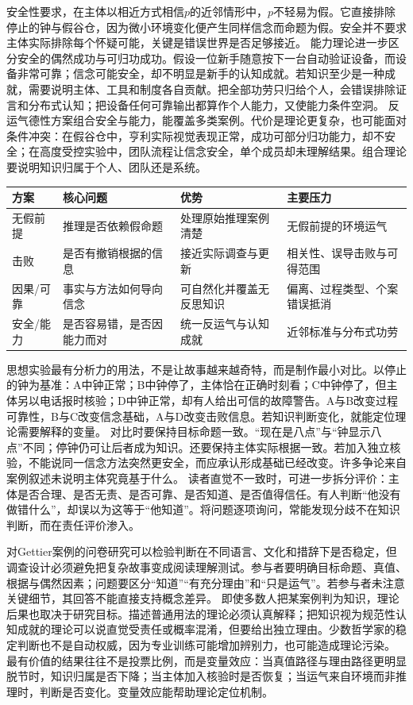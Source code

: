 安全性要求，在主体以相近方式相信$p$的近邻情形中，$p$不轻易为假。它直接排除停止的钟与假谷仓，因为微小环境变化便产生同样信念而命题为假。安全并不要求主体实际排除每个怀疑可能，关键是错误世界是否足够接近。 能力理论进一步区分安全的偶然成功与可归功成功。假设一位新手随意按下一台自动验证设备，而设备非常可靠；信念可能安全，却不明显是新手的认知成就。若知识至少是一种成就，需要说明主体、工具和制度各自贡献。把全部功劳只归给个人，会错误排除证言和分布式认知；把设备任何可靠输出都算作个人能力，又使能力条件空洞。 反运气德性方案组合安全与能力，能覆盖多类案例\parencite{pritchard2012}。代价是理论更复杂，也可能面对条件冲突：在假谷仓中，亨利实际视觉表现正常，成功可部分归功能力，却不安全；在高度受控实验中，团队流程让信念安全，单个成员却未理解结果。组合理论要说明知识归属于个人、团队还是系统。

\begin{center}
\begin{tabularx}{\textwidth}{@{}p{2.2cm}XXX@{}}
\toprule
方案 & 核心问题 & 优势 & 主要压力 \\
\midrule
无假前提 & 推理是否依赖假命题 & 处理原始推理案例清楚 & 无假前提的环境运气 \\
击败 & 是否有撤销根据的信息 & 接近实际调查与更新 & 相关性、误导击败与可得范围 \\
因果/可靠 & 事实与方法如何导向信念 & 可自然化并覆盖无反思知识 & 偏离、过程类型、个案错误抵消 \\
安全/能力 & 是否容易错，是否因能力而对 & 统一反运气与认知成就 & 近邻标准与分布式功劳 \\
\bottomrule
\end{tabularx}
\end{center}

思想实验最有分析力的用法，不是让故事越来越奇特，而是制作最小对比。以停止的钟为基准：A中钟正常；B中钟停了，主体恰在正确时刻看；C中钟停了，但主体另以电话报时核验；D中钟正常，却有人给出可信的故障警告。A与B改变过程可靠性，B与C改变信念基础，A与D改变击败信息。若知识判断变化，就能定位理论需要解释的变量。 对比时要保持目标命题一致。“现在是八点”与“钟显示八点”不同；停钟仍可让后者成为知识。还要保持主体实际根据一致。若加入独立核验，不能说同一信念方法突然更安全，而应承认形成基础已经改变。许多争论来自案例叙述未说明主体究竟基于什么。 读者直觉不一致时，可进一步拆分评价：主体是否合理、是否无责、是否可靠、是否知道、是否值得信任。有人判断“他没有做错什么”，却误以为这等于“他知道”。将问题逐项询问，常能发现分歧不在知识判断，而在责任评价渗入。

对Gettier案例的问卷研究可以检验判断在不同语言、文化和措辞下是否稳定，但调查设计必须避免把复杂故事变成阅读理解测试。参与者要明确目标命题、真值、根据与偶然因素；问题要区分“知道”“有充分理由”和“只是运气”。若参与者未注意关键细节，其回答不能直接支持概念差异。 即使多数人把某案例判为知识，理论后果也取决于研究目标。描述普通用法的理论必须认真解释；把知识视为规范性认知成就的理论可以说直觉受责任或概率混淆，但要给出独立理由。少数哲学家的稳定判断也不是自动权威，因为专业训练可能增加辨别力，也可能造成理论污染。 最有价值的结果往往不是投票比例，而是变量效应：当真值路径与理由路径更明显脱节时，知识归属是否下降；当主体加入核验时是否恢复；当运气来自环境而非推理时，判断是否变化。变量效应能帮助理论定位机制。

